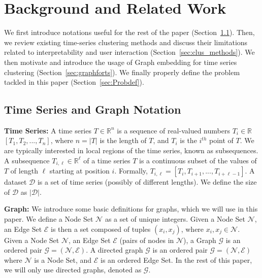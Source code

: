 
\section{Background and Related Work}
\label{sec:background}

We first introduce
notations useful for the rest of the paper (Section~\ref{sec:notation}). Then, we review
existing time-series clustering methods and discuss their limitations related to interpretability and user interaction (Section~\ref{sec:clus_methods}). We then motivate and introduce the usage of Graph embedding for time series clustering (Section~\ref{sec:graphforts}). We finally properly define the problem tackled in this paper (Section~\ref{sec:Probdef}).

\subsection{Time Series and Graph Notation}
\label{sec:notation}

\textbf{Time Series: }A  time series $T \in \mathbb{R}^n $ is a sequence of real-valued numbers $T_i\in\mathbb{R}$ $[T_1,T_2,...,T_n]$, where $n=|T|$ is the length of $T$, and $T_i$ is the $i^{th}$ point of $T$.  We are typically interested in local regions of the time series, known as subsequences. A subsequence $T_{i,\ell} \in \mathbb{R}^\ell$ of a time series $T$ is a continuous subset of the values of $T$ of length $\ell$ starting at position $i$. Formally, $T_{i,\ell} = [T_i, T_{i+1},...,T_{i+\ell-1}]$.
A dataset $\mathcal{D}$ is a set of time series (possibly of different lengths). 
We define the size of $\mathcal{D}$ as $|\mathcal{D}|$.

\noindent \textbf{Graph: }
We introduce some basic definitions for graphs, which we will use in this paper.
We define a Node Set $\mathcal{N}$ as a set of unique integers.
Given a Node Set $\mathcal{N}$, an Edge Set $\mathcal{E}$ is then a set composed of tuples $(x_i,x_j)$, where $x_i,x_j \in \mathcal{N}$. 
Given a Node Set $\mathcal{N}$, an Edge Set $\mathcal{E}$ (pairs of nodes in $\mathcal{N}$), a Graph $\mathcal{G}$ is an ordered pair $\mathcal{G}=(\mathcal{N},\mathcal{E})$.
A directed graph $\mathcal{G}$ is an ordered pair $\mathcal{G}=(\mathcal{N},\mathcal{E})$ where $\mathcal{N}$ is a Node Set, and $\mathcal{E}$ is an ordered Edge Set.
In the rest of this paper, we will only use directed graphs, denoted as $\mathcal{G}$.

